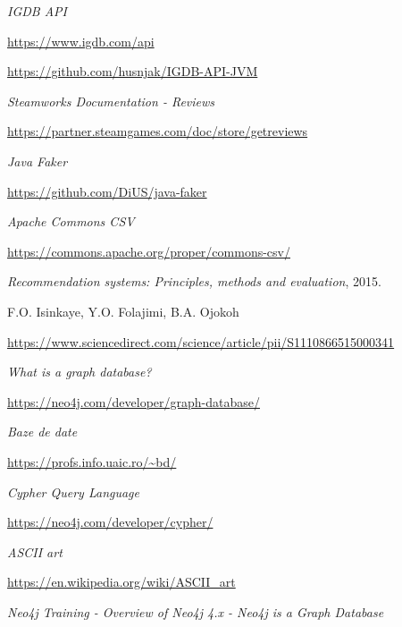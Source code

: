 \documentclass[12pt,a4paper]{report}
\begin{document}
\renewcommand\bibname{Bibliografie}
\begin{thebibliography}{9}

  
  \textit{IGDB API}
  
  \url{https://www.igdb.com/api}
  
  \url{https://github.com/husnjak/IGDB-API-JVM}
  
  
  \textit{Steamworks Documentation - Reviews}
  
  \url{https://partner.steamgames.com/doc/store/getreviews}
  
  
  \textit{Java Faker}
  
  \url{https://github.com/DiUS/java-faker}
  
  
  \textit{Apache Commons CSV}
  
  \url{https://commons.apache.org/proper/commons-csv/}


  
  \textit{Recommendation systems: Principles, methods and evaluation},
  2015.
  
  F.O. Isinkaye, Y.O. Folajimi, B.A. Ojokoh
  
  \url{https://www.sciencedirect.com/science/article/pii/S1110866515000341}
  
  
  \textit{What is a graph database?}
  
  \url{https://neo4j.com/developer/graph-database/}
  
  
  \textit{Baze de date}
  
  \url{https://profs.info.uaic.ro/~bd/}
  
  
  \textit{Cypher Query Language}
  
  \url{https://neo4j.com/developer/cypher/}
  
  
  \textit{ASCII art}
  
  \url{https://en.wikipedia.org/wiki/ASCII_art}
  
  
  \textit{Neo4j Training - Overview of Neo4j 4.x - Neo4j is a Graph Database  }
  

\end{thebibliography}
\end{document}
